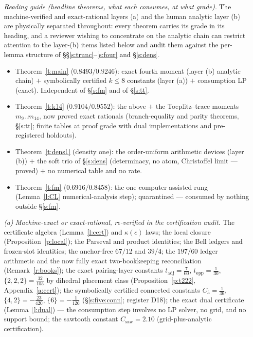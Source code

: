 \documentclass[11pt]{article}
\numberwithin{equation}{section}
\theoremstyle{definition}
\theoremstyle{remark}
\begin{document}
\medskip
\noindent\emph{Reading guide (headline theorems, what each
consumes, at what grade).} The machine-verified and
exact-rational layers (a) and the human analytic layer (b)
are physically separated throughout: every theorem carries
its grade in its heading, and a reviewer wishing to
concentrate on the analytic chain can restrict attention to
the layer-(b) items listed below and audit them against the
per-lemma structure of
\S\S\ref{s:trunc}--\ref{s:four} and \S\ref{s:dens}.
\begin{itemize}
\item Theorem~\ref{t:main} ($0.8493/0.9246$): exact fourth
moment (layer (b) analytic chain) $+$ symbolically certified
$k\le8$ constants (layer (a)) $+$ consumption LP (exact).
Independent of \S\ref{s:fm} and of \S\ref{s:tt}.
\item Theorem~\ref{t:k14} ($0.9104/0.9552$): the above $+$
the Toeplitz--trace moments $m_9..m_{14}$, now proved exact
rationals (branch-equality and parity theorems, \S\ref{s:tt};
finite tables at proof grade with dual implementations and
pre-registered holdouts).
\item Theorem~\ref{t:dens1} (density one): the order-uniform
arithmetic devices (layer (b)) $+$ the soft trio of
\S\ref{s:dens} (determinacy, no atom, Christoffel limit ---
proved) $+$ no numerical table and no rate.
\item Theorem~\ref{t:fm} ($0.6916/0.8458$): the one
computer-assisted rung (Lemma~\ref{l:CL} numerical-analysis
step); quarantined --- consumed by nothing outside
\S\ref{s:fm}.
\end{itemize}
\medskip

\emph{(a) Machine-exact or exact-rational, re-verified in the
certification audit.} The certificate algebra (Lemma~\ref{l:cert}) and
$\kappa(c)$ laws; the local closure
(Proposition~\ref{p:local}); the Parseval and product identities;
the Bell ledgers and frozen-slot identities; the anchor-free
$67/12$ and $39/4$; the $197/60$ ledger arithmetic and the now
fully exact two-bookkeeping reconciliation
(Remark~\ref{r:books}); the exact pairing-layer constants
$t_{\mathrm{adj}}=\tfrac7{60}$, $t_{\mathrm{opp}}=\tfrac1{30}$,
$\{2,2,2\}=\tfrac{32}{105}$ by dihedral placement class
(Proposition~\ref{p:t222},
Appendix~\ref{a:cert}); the symbolically certified connected
constants $C_5=\tfrac1{36}$, $\{4,2\}=-\tfrac{23}{420}$,
$\{6\}=-\tfrac1{126}$ (\S\ref{s:five:conn}; register D18);
the exact dual certificate
(Lemma~\ref{l:dual}) --- the consumption step involves no LP
solver, no grid, and no support bound; the sawtooth constant
$C_{\mathrm{saw}}=2.10$ (grid-plus-analytic certification).
\end{document}
